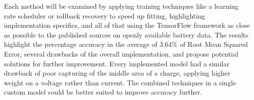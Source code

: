 {Each method will be examined by applying training techniques like a learning rate scheduler or rollback recovery to speed up fitting, highlighting implementation specifics, and all of that using the TensorFlow framework as close as possible to the published sources on openly available battery data.
The results highlight the percentage accuracy in the average of 3.64\% of Root Mean Squared Error, several drawbacks of the overall implementation, and propose potential solutions for further improvement.
Every implemented model had a similar drawback of poor capturing of the middle area of a charge, applying higher weight on a voltage rather than current.
The combined techniques in a single custom model could be better suited to improve accuracy further.
}